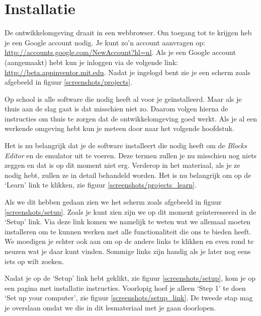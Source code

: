 \chapter{Installatie}

De \ai ontwikkelomgeving draait in een webbrowser. Om toegang tot \ai te krijgen heb je een Google account nodig. Je kunt zo'n account aanvragen op: \url{http://accounts.google.com/NewAccount?hl=nl}. Als je een Google account (aangemaakt) hebt kun je inloggen via de volgende link: \url{http://beta.appinventor.mit.edu}.
Nadat je ingelogd bent zie je een scherm zoals afgebeeld in figuur \ref{screenshots/projects}.

 
Op school is alle software die \ai nodig heeft al voor je ge\"installeerd. Maar als je thuis aan de slag gaat is dat misschien niet zo. Daarom volgen hierna de instructies om thuis te zorgen dat de \ai ontwikkelomgeving goed werkt. Als je al een werkende omgeving hebt kun je meteen door naar het volgende hoofdstuk. 

Het is nu belangrijk dat je de software installeert die \ai nodig heeft om de \emph{Blocks Editor} en de emulator uit te voeren. Deze termen zullen je nu misschien nog niets zeggen en dat is op dit moment niet erg. Verderop in het materiaal, als je ze nodig hebt, zullen ze in detail behandeld worden. Het is nu belangrijk om op de `Learn' link te klikken, zie figuur \ref{screenshots/projects_learn}.


Als we dit hebben gedaan zien we het scherm zoals afgebeeld in figuur \ref{screenshots/setup}. Zoals je kunt zien zijn we op dit moment ge\"interesseerd in de `Setup' link. Via deze link komen we namelijk te weten wat we allemaal moeten installeren om te kunnen werken met alle functionaliteit die \ai ons te bieden heeft.
We moedigen je echter ook aan om op de andere links te klikken en even rond te neuzen wat je daar kunt vinden. Sommige links zijn handig als je later nog eens iets op wilt zoeken.


Nadat je op de `Setup' link hebt geklikt, zie figuur \ref{screenshots/setup}, kom je op een pagina met installatie instructies. Voorlopig hoef je alleen `Step 1' te doen `Set up your computer', zie figuur \ref{screenshots/setup_link}.
De tweede stap mag je overslaan omdat we die in dit lesmateriaal met je gaan doorlopen.

